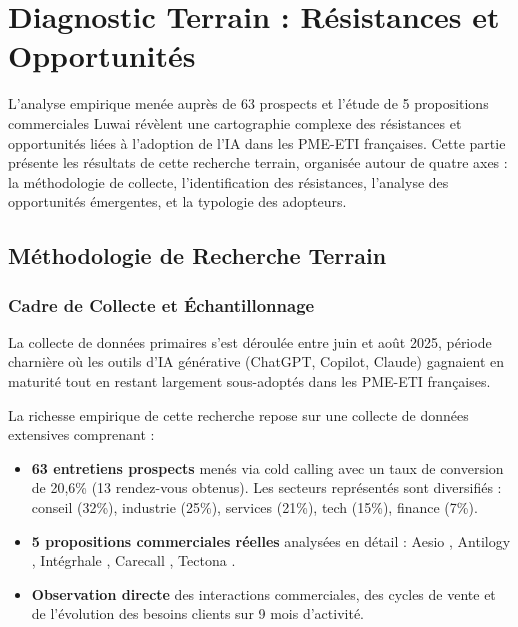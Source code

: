 \chapter{Diagnostic Terrain : Résistances et Opportunités}
\label{chap:field_diagnosis}

L'analyse empirique menée auprès de 63 prospects et l'étude de 5 propositions commerciales Luwai révèlent une cartographie complexe des résistances et opportunités liées à l'adoption de l'IA dans les PME-ETI françaises. Cette partie présente les résultats de cette recherche terrain, organisée autour de quatre axes : la méthodologie de collecte, l'identification des résistances, l'analyse des opportunités émergentes, et la typologie des adopteurs.

\section{Méthodologie de Recherche Terrain}

\subsection{Cadre de Collecte et Échantillonnage}

La collecte de données primaires s'est déroulée entre juin et août 2025, période charnière où les outils d'IA générative (ChatGPT, Copilot, Claude) gagnaient en maturité tout en restant largement sous-adoptés dans les PME-ETI françaises.

La richesse empirique de cette recherche repose sur une collecte de données extensives comprenant :

\begin{itemize}
    \item \textbf{63 entretiens prospects} \cite{luwai2025base} menés via cold calling avec un taux de conversion de 20,6\% (13 rendez-vous obtenus). Les secteurs représentés sont diversifiés : conseil (32\%), industrie (25\%), services (21\%), tech (15\%), finance (7\%).
    \item \textbf{5 propositions commerciales réelles} analysées en détail : Aesio \cite{luwai2025aesio}, Antilogy \cite{luwai2025antilogy}, Intégrhale \cite{luwai2025integrhale}, Carecall \cite{luwai2025carecall}, Tectona \cite{luwai2025tectona}.
    \item \textbf{Observation directe} des interactions commerciales, des cycles de vente et de l'évolution des besoins clients sur 9 mois d'activité.
\end{itemize}

